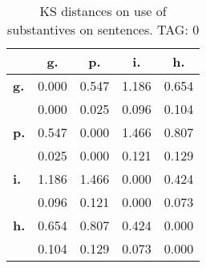 \begin{table}[h!]
\begin{center}
\begin{tabular}{| l || c | c | c | c |}\hline
 & {\bf g.} & {\bf p.} & {\bf i.} & {\bf h.} \\\hline\hline
{\bf g.} & 0.000 & 0.547 & 1.186 & 0.654 \\
{\bf } & 0.000 & 0.025 & 0.096 & 0.104 \\\hline
{\bf p.} & 0.547 & 0.000 & 1.466 & 0.807 \\
{\bf } & 0.025 & 0.000 & 0.121 & 0.129 \\\hline
{\bf i.} & 1.186 & 1.466 & 0.000 & 0.424 \\
{\bf } & 0.096 & 0.121 & 0.000 & 0.073 \\\hline
{\bf h.} & 0.654 & 0.807 & 0.424 & 0.000 \\
{\bf } & 0.104 & 0.129 & 0.073 & 0.000 \\\hline
\end{tabular}
\caption{KS distances on use of substantives on sentences. TAG: 0}
\end{center}
\end{table}